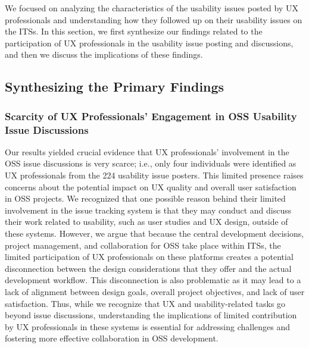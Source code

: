 We focused on analyzing the characteristics of the usability issues posted by UX professionals and understanding how they followed up on their usability issues on the ITSs. In this section, we first synthesize our findings related to the participation of UX professionals in the usability issue posting and discussions, and then we discuss the implications of these findings.

\subsection{Synthesizing the Primary Findings}

\subsubsection{Scarcity of UX Professionals' Engagement in OSS Usability Issue Discussions}
Our results yielded crucial evidence that UX professionals' involvement in the OSS issue discussions is very scarce; i.e., only four individuals were identified as UX professionals from the 224 usability issue posters. This limited presence raises concerns about the potential impact on UX quality and overall user satisfaction in OSS projects. We recognized that one possible reason behind their limited involvement in the issue tracking system is that they may conduct and discuss their work related to usability, such as user studies and UX design, outside of these systems. However, we argue that because the central development decisions, project management, and collaboration for OSS take place within ITSs, the limited participation of UX professionals on these platforms creates a potential disconnection between the design considerations that they offer and the actual development workflow. This disconnection is also problematic as it may lead to a lack of alignment between design goals, overall project objectives, and lack of user satisfaction. Thus, while we recognize that UX and usability-related tasks go beyond issue discussions, understanding the implications of limited contribution by UX professionals in these systems is essential for addressing challenges and fostering more effective collaboration in OSS development.

